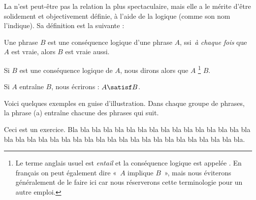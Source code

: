 
La  
n'est peut-être pas la relation la plus spectaculaire, mais elle a le mérite d'être
solidement et objectivement définie, à l'aide de la logique (comme son nom l'indique).  Sa définition est la suivante :


\begin{defi}%
\label{d:conseq}
Une phrase $B$ est une conséquence logique d'une phrase $A$,
ssi\footnotemark\ \emph{à
chaque fois} que $A$ est vraie, alors $B$ est vraie aussi.
\end{defi}%
%


Si $B$ est une conséquence logique de $A$, nous dirons alors que $A$ \footnote{Le terme anglais usuel
est \emph{entail} et la conséquence logique est appelée .  En français on peut également dire «~$A$ implique $B$~», mais nous éviterons généralement de le faire ici car
nous réserverons cette terminologie pour un autre emploi.} $B$.



\begin{nota}
Si $A$ entraîne $B$, nous écrirons : $A\satisf B$.
\end{nota}

Voici quelques exemples en guise d'illustration.  Dans chaque groupe
de phrases, la phrase (a) entraîne chacune des phrases qui suit.  

\begin{exo}
Ceci est un exercice. Bla bla bla bla bla bla bla bla bla bla bla bla bla bla bla bla bla bla bla bla bla bla bla bla bla bla bla bla bla bla bla bla bla bla bla bla bla.
\end{exo}
